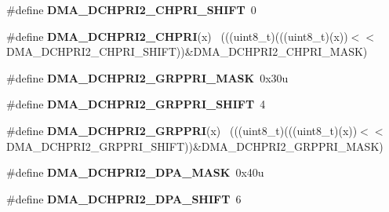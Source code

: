 \begin{DoxyCompactItemize}
\item 
\hypertarget{group___d_m_a___register___masks_gaf8e134ae4fb5fe5af8e99f78b9e7d958}{}\#define {\bfseries D\+M\+A\+\_\+\+D\+C\+H\+P\+R\+I2\+\_\+\+C\+H\+P\+R\+I\+\_\+\+S\+H\+I\+F\+T}~0\label{group___d_m_a___register___masks_gaf8e134ae4fb5fe5af8e99f78b9e7d958}

\item 
\hypertarget{group___d_m_a___register___masks_ga9946d8f05a59d8682f789db072e34adb}{}\#define {\bfseries D\+M\+A\+\_\+\+D\+C\+H\+P\+R\+I2\+\_\+\+C\+H\+P\+R\+I}(x)                                      ~(((uint8\+\_\+t)(((uint8\+\_\+t)(x))$<$$<$D\+M\+A\+\_\+\+D\+C\+H\+P\+R\+I2\+\_\+\+C\+H\+P\+R\+I\+\_\+\+S\+H\+I\+F\+T))\&D\+M\+A\+\_\+\+D\+C\+H\+P\+R\+I2\+\_\+\+C\+H\+P\+R\+I\+\_\+\+M\+A\+S\+K)\label{group___d_m_a___register___masks_ga9946d8f05a59d8682f789db072e34adb}

\item 
\hypertarget{group___d_m_a___register___masks_ga6bf59123a630f3aee60c7368310fbead}{}\#define {\bfseries D\+M\+A\+\_\+\+D\+C\+H\+P\+R\+I2\+\_\+\+G\+R\+P\+P\+R\+I\+\_\+\+M\+A\+S\+K}~0x30u\label{group___d_m_a___register___masks_ga6bf59123a630f3aee60c7368310fbead}

\item 
\hypertarget{group___d_m_a___register___masks_ga460108d76849581e0af5aa7a757e967d}{}\#define {\bfseries D\+M\+A\+\_\+\+D\+C\+H\+P\+R\+I2\+\_\+\+G\+R\+P\+P\+R\+I\+\_\+\+S\+H\+I\+F\+T}~4\label{group___d_m_a___register___masks_ga460108d76849581e0af5aa7a757e967d}

\item 
\hypertarget{group___d_m_a___register___masks_gaccad09b35e8d5b1a8757925705b0d050}{}\#define {\bfseries D\+M\+A\+\_\+\+D\+C\+H\+P\+R\+I2\+\_\+\+G\+R\+P\+P\+R\+I}(x)                                    ~(((uint8\+\_\+t)(((uint8\+\_\+t)(x))$<$$<$D\+M\+A\+\_\+\+D\+C\+H\+P\+R\+I2\+\_\+\+G\+R\+P\+P\+R\+I\+\_\+\+S\+H\+I\+F\+T))\&D\+M\+A\+\_\+\+D\+C\+H\+P\+R\+I2\+\_\+\+G\+R\+P\+P\+R\+I\+\_\+\+M\+A\+S\+K)\label{group___d_m_a___register___masks_gaccad09b35e8d5b1a8757925705b0d050}

\item 
\hypertarget{group___d_m_a___register___masks_gabb7c0ad697d56ee419d906f85515f222}{}\#define {\bfseries D\+M\+A\+\_\+\+D\+C\+H\+P\+R\+I2\+\_\+\+D\+P\+A\+\_\+\+M\+A\+S\+K}~0x40u\label{group___d_m_a___register___masks_gabb7c0ad697d56ee419d906f85515f222}

\item 
\hypertarget{group___d_m_a___register___masks_ga1bb0bb4e70fc28664327a789d7b3f174}{}\#define {\bfseries D\+M\+A\+\_\+\+D\+C\+H\+P\+R\+I2\+\_\+\+D\+P\+A\+\_\+\+S\+H\+I\+F\+T}~6\label{group___d_m_a___register___masks_ga1bb0bb4e70fc28664327a789d7b3f174}


\end{DoxyCompactItemize}
